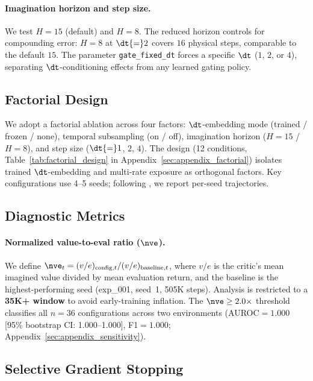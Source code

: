 \paragraph{Imagination horizon and step size.}
We test $H{=}15$ (default) and $H{=}8$. The reduced horizon controls for compounding error: $H{=}8$ at $\dt{=}2$ covers $16$ physical steps, comparable to the default $15$. The parameter \texttt{gate\_fixed\_dt} forces a specific $\dt$ ($1$, $2$, or $4$), separating $\dt$-conditioning effects from any learned gating policy.

\subsection{Factorial Design}
\label{sec:factorial}

We adopt a factorial ablation across four factors: $\dt$-embedding mode (trained / frozen / none), temporal subsampling (on / off), imagination horizon ($H{=}15$ / $H{=}8$), and step size ($\dt{=}1$, $2$, $4$). The design (12 conditions, Table~\ref{tab:factorial_design} in Appendix~\ref{sec:appendix_factorial}) isolates trained $\dt$-embedding and multi-rate exposure as orthogonal factors. Key configurations use 4--5 seeds; following \citet{agarwal2021precipice}, we report per-seed trajectories.

\subsection{Diagnostic Metrics}
\label{sec:metrics}

\paragraph{Normalized value-to-eval ratio ($\nve$).}
We define $\nve_t = (v/e)_{\text{config},t} / (v/e)_{\text{baseline},t}$, where $v/e$ is the critic's mean imagined value divided by mean evaluation return, and the baseline is the highest-performing seed (exp\_001, seed~1, 505K steps). Analysis is restricted to a \textbf{35K+ window} to avoid early-training inflation. The $\nve \geq 2.0\times$ threshold classifies all $n{=}36$ configurations across two environments (AUROC${=}1.000$ [95\% bootstrap CI: 1.000--1.000], F1${=}1.000$; Appendix~\ref{sec:appendix_sensitivity}).

\subsection{Selective Gradient Stopping}
\label{sec:sgs_method}

